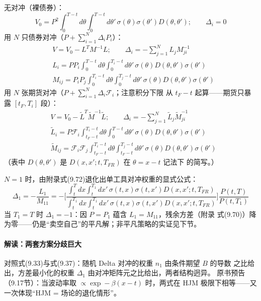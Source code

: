 无对冲（裸债券）：
\begin{equation*}
V_0=P^{2}\int_{0}^{T-t}d\theta\int_{0}^{T-t}d\theta'\,
\sigma(\theta)\sigma(\theta')D(\theta,\theta');\qquad
\Delta_i=0
\end{equation*}
用 $N$ 只债券对冲（$P+\sum_{i=1}^{N}\Delta_iP_i$）：
\begin{align*}
&V=V_0-L^{T}M^{-1}L;\qquad
\Delta_i=-\sum_{j=1}^{N}L_jM^{-1}_{ji}\\
&L_i=PP_i\int_{0}^{T-t}d\theta\int_{0}^{T_i-t}d\theta'\,
\sigma(\theta)D(\theta,\theta')\sigma(\theta')\\
&M_{ij}=P_iP_j\int_{0}^{T_i-t}d\theta\int_{0}^{T_j-t}d\theta'\,
\sigma(\theta)D(\theta,\theta')\sigma(\theta')
\end{align*}
用 $N$ 张期货对冲（$P+\sum_{i=1}^{N}\Delta_i\mathcal{F}_i$；注意积分下限
从 $t_F-t$ 起算——期货只暴露 $[t_F,T_i]$ 段）：
\begin{align*}
&V=V_0-\tilde{L}^{T}\tilde{M}^{-1}\tilde{L};\qquad
\Delta_i=-\sum_{j=1}^{N}\tilde{L}_j\tilde{M}^{-1}_{ji}\\
&\tilde{L}_i=P\mathcal{F}_i\int_{t_F-t}^{T_i-t}d\theta\int_{0}^{T-t}
d\theta'\,\sigma(\theta)D(\theta,\theta')\sigma(\theta')\\
&\tilde{M}_{ij}=\mathcal{F}_i\mathcal{F}_j\int_{t_F-t}^{T_i-t}d\theta
\int_{t_F-t}^{T_j-t}d\theta'\,\sigma(\theta)D(\theta,\theta')\sigma(\theta')
\end{align*}
（表中 $D(\theta,\theta')$ 是 $D(x,x';t,T_{FR})$ 在 $\theta=x-t$ 记法下
的简写。）

$N=1$ 时，由附录式(9.72)退化出单工具对冲权重的显式公式：
\begin{equation*}
\Delta_1=-\frac{L_1}{M_{11}}
=-\biggl[\frac{\int_{t}^{T}dx\int_{t}^{T_1}dx'\,\sigma(t,x)\sigma(t,x')
D(x,x';t,T_{FR})}{\int_{t}^{T_1}dx\int_{t}^{T_1}dx'\,\sigma(t,x)\sigma(t,x')
D(x,x';t,T_{FR})}\biggr]\frac{P(t,T)}{P(t,T_1)}\tag{9.37}
\end{equation*}
当 $T_1=T$ 时 $\Delta_1=-1$：因 $P=P_1$ 蕴含 $L_1=M_{11}$，残余方差（附录
式(9.70)）降为零——仍是“卖空自己”的平凡解；非平凡策略的实证见下节。

\paragraph{解读：两套方案分歧巨大}
对照式(9.33)与式(9.37)：随机 Delta 对冲的权重 $n_1$ 由条件期望 $B$ 的导数
之比给出，方差最小化的权重 $\Delta_1$ 由对冲矩阵元之比给出，两者结构迥异。
原书预告（9.17节）：当波动率取 $\propto\exp-\beta(x-t)$ 时，两式在 HJM
极限下相等——又一次体现“HJM = 场论的退化情形”。

